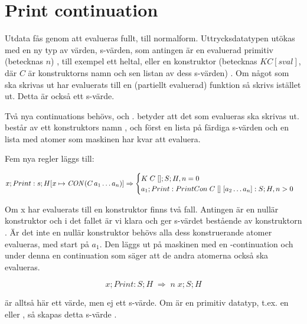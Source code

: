 \documentclass[../Appendix]{subfiles}
\begin{document}
\chapter{Print continuation}
\label{sec:printcont}
Utdata fås genom att  evalueras fullt, till normalform. 
Uttrycksdatatypen utökas med en ny typ av värden, 
s-värden, som antingen är en evaluerad primitiv (betecknas $n$)
, till exempel ett heltal, eller en konstruktor (betecknas $K C [sval]$, där
$C$ är konstruktorns namn och sen listan av dess s-värden) .
Om något som ska skrivas ut har evaluerats till en (partiellt evaluerad)
funktion så skrivs  istället ut. Detta är också ett s-värde.





Två nya continuations behövs,  och .
 betyder att det som evalueras ska skrivas ut.  består av ett
konstruktors namn , och först en lista på färdiga s-värden och en lista med
atomer som maskinen har kvar att evaluera.

Fem nya regler läggs till:

\[
x ; Print : s ; H[x \mapsto \text{\emph{CON}}(C\,a_1 \ldots a_n)]
\Rightarrow \begin{cases} 
K \; C \; [] ; S ; H , n = 0 \\
a_1 ; Print : PrintCon \; C \; [] \; [a_2 \ldots a_n] : S ; H , n > 0
\end{cases}
\]

Om x har evaluerats till en konstruktor  finns två fall. Antingen är 
en nullär konstruktor och i det fallet är vi klara och ger s-värdet bestående
av konstruktorn .
    Är det inte en nullär konstruktor behövs alla dess konstruerande atomer
evalueras, med start på $a_1$. Den läggs ut på maskinen med en -continuation
och under denna en continuation som säger att de andra atomerna också ska
evalueras.
 

\[
x ; Print : S ; H \; \Rightarrow \; n \; x ; S ; H
\]

 är alltså här ett värde, men ej ett s-värde.
Om  är en primitiv datatyp, t.ex. en  eller , så skapas detta s-värde
.
\end{document}
